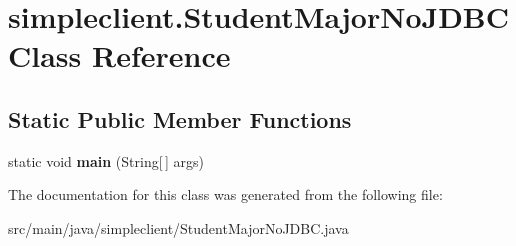 \hypertarget{classsimpleclient_1_1StudentMajorNoJDBC}{}\section{simpleclient.\+Student\+Major\+No\+J\+D\+BC Class Reference}
\label{classsimpleclient_1_1StudentMajorNoJDBC}
\subsection*{Static Public Member Functions}
\begin{DoxyCompactItemize}
\item 
\mbox{\label{classsimpleclient_1_1StudentMajorNoJDBC_aa7361bcb6c55c601566df7667414035e}} 
static void {\bfseries main} (String\mbox{[}$\,$\mbox{]} args)
\end{DoxyCompactItemize}


The documentation for this class was generated from the following file\+:\begin{DoxyCompactItemize}
\item 
src/main/java/simpleclient/Student\+Major\+No\+J\+D\+B\+C.\+java\end{DoxyCompactItemize}
